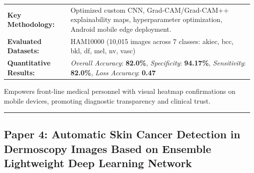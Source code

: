 \documentclass[10pt,a4paper]{article}
\begin{document}
\vspace{4pt}
\begin{tabularx}{\linewidth}{p{3.2cm}X}
\toprule
\textbf{Key Methodology:} & Optimized custom CNN, Grad-CAM/Grad-CAM++ explainability maps, hyperparameter optimization, Android mobile edge deployment. \\
\textbf{Evaluated Datasets:} & HAM10000 (10,015 images across 7 classes: akiec, bcc, bkl, df, mel, nv, vasc) \\
\textbf{Quantitative Results:} & \textit{Overall Accuracy}: \textbf{82.0\%}, \textit{Specificity}: \textbf{94.17\%}, \textit{Sensitivity}: \textbf{82.0\%}, \textit{Loss Accuracy}: \textbf{0.47} \\
\bottomrule
\end{tabularx}
\vspace{4pt}
\begin{tcolorbox}[utilitybox,title=Clinical Utility and Real-World Impact]
Empowers front-line medical personnel with visual heatmap confirmations on mobile devices, promoting diagnostic transparency and clinical trust.
\end{tcolorbox}
\vspace{12pt}
\hrule
\vspace{12pt}
\subsection*{Paper 4: Automatic Skin Cancer Detection in Dermoscopy Images Based on Ensemble Lightweight Deep Learning Network}
\end{document}
